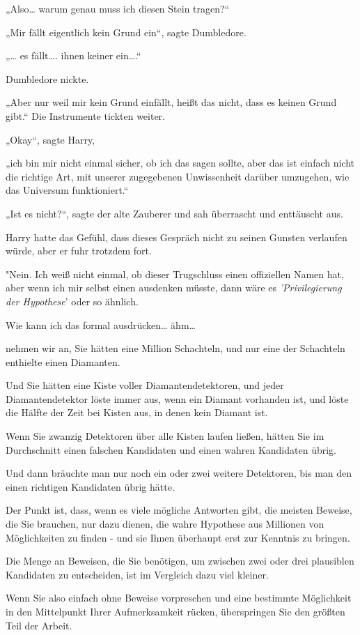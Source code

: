 {„Also… warum genau muss ich diesen Stein tragen?“

„Mir fällt eigentlich kein Grund ein“, sagte Dumbledore.

„… es fällt…. ihnen keiner ein….“

Dumbledore nickte.

„Aber nur weil mir kein Grund einfällt, heißt das nicht, dass es keinen Grund gibt.“ Die Instrumente tickten weiter.

„Okay“, sagte Harry,

„ich bin mir nicht einmal sicher, ob ich das sagen sollte, aber das ist einfach nicht die richtige Art, mit unserer zugegebenen Unwissenheit darüber umzugehen, wie das Universum funktioniert.“

„Ist es nicht?“, sagte der alte Zauberer und sah überrascht und enttäuscht aus.

Harry hatte das Gefühl, dass dieses Gespräch nicht zu seinen Gunsten verlaufen würde, aber er fuhr trotzdem fort.

"Nein. Ich weiß nicht einmal, ob dieser Trugschluss einen offiziellen Namen hat, aber wenn ich mir selbst einen ausdenken müsste, dann wäre es \emph{'Privilegierung der Hypothese}' oder so ähnlich.

Wie kann ich das formal ausdrücken… ähm…

nehmen wir an, Sie hätten eine Million Schachteln, und nur eine der Schachteln enthielte einen Diamanten.

Und Sie hätten eine Kiste voller Diamantendetektoren, und jeder Diamantendetektor löste immer aus, wenn ein Diamant vorhanden ist, und löste die Hälfte der Zeit bei Kisten aus, in denen kein Diamant ist.

Wenn Sie zwanzig Detektoren über alle Kisten laufen ließen, hätten Sie im Durchschnitt einen falschen Kandidaten und einen wahren Kandidaten übrig.

Und dann bräuchte man nur noch ein oder zwei weitere Detektoren, bis man den einen richtigen Kandidaten übrig hätte.

Der Punkt ist, dass, wenn es viele mögliche Antworten gibt, die meisten Beweise, die Sie brauchen, nur dazu dienen, die wahre Hypothese aus Millionen von Möglichkeiten zu finden - und sie Ihnen überhaupt erst zur Kenntnis zu bringen.

Die Menge an Beweisen, die Sie benötigen, um zwischen zwei oder drei plausiblen Kandidaten zu entscheiden, ist im Vergleich dazu viel kleiner.

Wenn Sie also einfach ohne Beweise vorpreschen und eine bestimmte Möglichkeit in den Mittelpunkt Ihrer Aufmerksamkeit rücken, überspringen Sie den größten Teil der Arbeit.

}
